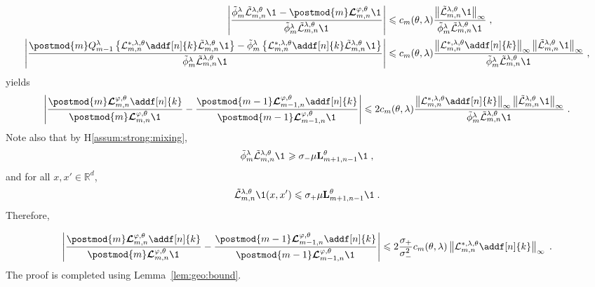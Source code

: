 \documentclass{article}
\begin{document}
\begin{align*}
\left|\frac{\tilde\phi^\parvar_m\tilde{\mathcal{L}}^{\parvar,\parvec}_{m, n} \1_{}-\postmod{m} \retrokmod_{m, n} \1_{}}{\tilde\phi^\parvar_m\tilde{\mathcal{L}}^{\parvar,\parvec}_{m, n} \1_{}}\right|&\leqslant c_m(\parvec,\parvar)\frac{\left\|\tilde{\mathcal{L}}^{\parvar,\parvec}_{m, n} \1\right\|_\infty}{\tilde\phi^\parvar_m\tilde{\mathcal{L}}^{\parvar,\parvec}_{m, n}\1_{}}\eqsp,\\
\left|\frac{\postmod{m} Q_{m-1}^{\parvar} \left\{\mathcal{L}^{*,\parvar,\parvec}_{m, n} \addf[n]{k}\tilde{\mathcal{L}}^{\parvar,\parvec}_{m, n} \1\right\} - \tilde\phi^\parvar_m\left\{\mathcal{L}^{*,\parvar,\parvec}_{m, n} \addf[n]{k}\tilde{\mathcal{L}}^{\parvar,\parvec}_{m, n} \1\right\}}{\tilde\phi^\parvar_m\tilde{\mathcal{L}}^{\parvar,\parvec}_{m, n} \1_{}}\right| &\leqslant c_m(\parvec,\parvar)\frac{\left\|\mathcal{L}^{*,\parvar,\parvec}_{m, n} \addf[n]{k}\right\|_\infty\left\|\tilde{\mathcal{L}}^{\parvar,\parvec}_{m, n} \1\right\|_\infty}{\tilde\phi^\parvar_m\tilde{\mathcal{L}}^{\parvar,\parvec}_{m, n}\1_{}}\eqsp,
\end{align*}
yields
$$
\left| \frac{\postmod{m} \retrokmod_{m, n} \addf[n]{k}}{\postmod{m} \retrokmod_{m, n} \1_{}} - \frac{\postmod{m - 1} \retrokmod_{m - 1, n} \addf[n]{k}}{\postmod{m - 1} \retrokmod_{m - 1, n} \1_{}} \right|\leqslant 2c_m(\parvec,\parvar)\frac{\left\|\mathcal{L}^{*,\parvar,\parvec}_{m, n} \addf[n]{k}\right\|_\infty\left\|\tilde{\mathcal{L}}^{\parvar,\parvec}_{m, n} \1\right\|_\infty}{\tilde\phi^\parvar_m\tilde{\mathcal{L}}^{\parvar,\parvec}_{m, n}\1_{}}\eqsp.
$$
Note also that by H\ref{assum:strong:mixing},
$$
\tilde\phi^\parvar_m\tilde{\mathcal{L}}^{\parvar,\parvec}_{m, n}\1_{} \geqslant \sigma_- \mu  \uk{m+1, n-1}{\parvec}\1\eqsp,
$$ 
and for all $x,x'\in\mathbb{R}^d$,
$$
\tilde{\mathcal{L}}^{\parvar,\parvec}_{m, n} \1(x,x')\leqslant  \sigma_+\mu  \uk{m+1, n-1}{\parvec}\1\eqsp.
$$
Therefore,

$$
\left| \frac{\postmod{m} \retrokmod_{m, n} \addf[n]{k}}{\postmod{m} \retrokmod_{m, n} \1_{}} - \frac{\postmod{m - 1} \retrokmod_{m - 1, n} \addf[n]{k}}{\postmod{m - 1} \retrokmod_{m - 1, n} \1_{}} \right|\leqslant 2\frac{\sigma_+}{\sigma_-^2}c_m(\parvec,\parvar) \left\|\mathcal{L}^{*,\parvar,\parvec}_{m, n} \addf[n]{k}\right\|_\infty\eqsp.
$$
The proof is completed using Lemma~\ref{lem:geo:bound}.



\end{document}
